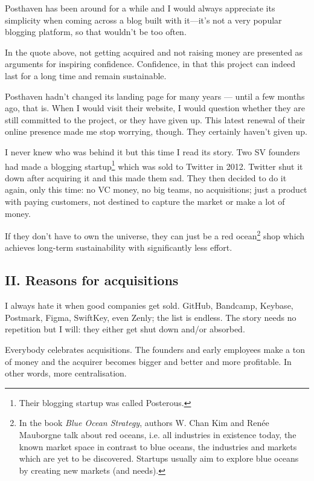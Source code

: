 Posthaven has been around for a while and I would always appreciate its simplicity when coming across a blog built with it—it’s not a very popular blogging platform, so that wouldn’t be too often.

In the quote above, not getting acquired and not raising money are presented as arguments for inspiring confidence. Confidence, in that this project can indeed last for a long time and remain sustainable.

Posthaven hadn’t changed its landing page for many years — until a few months ago, that is. When I would visit their website, I would question whether they are still committed to the project, or they have given up. This latest renewal of their online presence made me stop worrying, though. They certainly haven’t given up.

I never knew who was behind it but this time I read its story. Two SV founders had made a blogging startup\footnote{Their blogging startup was called Posterous.} which was sold to Twitter in 2012. Twitter shut it down after acquiring it and this made them sad. They then decided to do it again, only this time: no VC money, no big teams, no acquisitions; just a product with paying customers, not destined to capture the market or make a lot of money.

If they don’t have to own the universe, they can just be a red ocean\footnote{In the book \emph{Blue Ocean Strategy}, authors W. Chan Kim and Renée Mauborgne talk about red oceans, i.e. all industries in existence today, the known market space in contrast to blue oceans, the industries and markets which are yet to be discovered. Startups usually aim to explore blue oceans by creating new markets (and needs).} shop which achieves long-term sustainability with significantly less effort.

\subsection{II. Reasons for acquisitions}

I always hate it when good companies get sold. GitHub, Bandcamp, Keybase, Postmark, Figma, SwiftKey, even Zenly; the list is endless. The story needs no repetition but I will: they either get shut down and/or absorbed.

Everybody celebrates acquisitions. The founders and early employees make a ton of money and the acquirer becomes bigger and better and more profitable. In other words, more centralisation.

